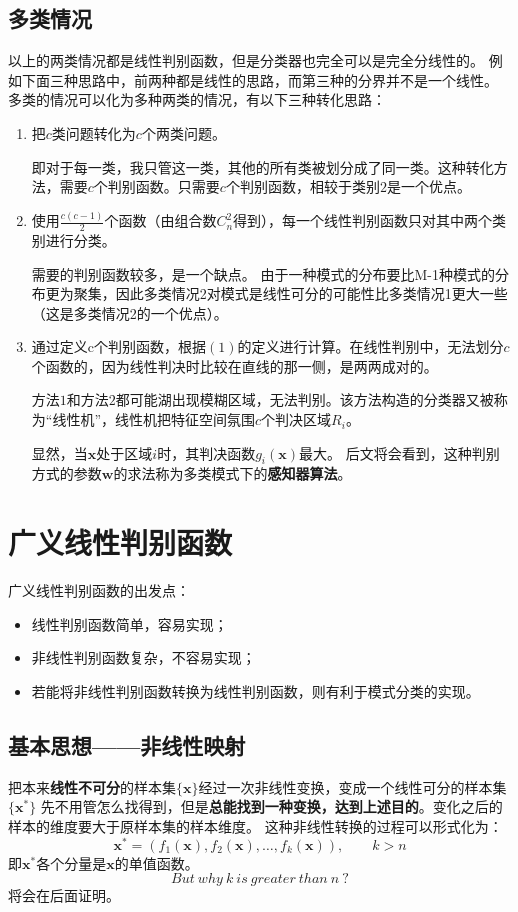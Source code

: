 \documentclass[12pt, letterpaper]{article}
\begin{document}
\subsection{多类情况}
以上的两类情况都是线性判别函数，但是分类器也完全可以是完全分线性的。
例如下面三种思路中，前两种都是线性的思路，而第三种的分界并不是一个线性。
多类的情况可以化为多种两类的情况，有以下三种转化思路：
\begin{enumerate}
\item 把$c$类问题转化为$c$个两类问题。

\qquad 即对于每一类，我只管这一类，其他的所有类被划分成了同一类。这种转化方法，需要$c$个判别函数。只需要$c$个判别函数，相较于类别$2$是一个优点。
\item 使用$\frac{c(c-1)}{2}$个函数（由组合数$C_n^2$得到），每一个线性判别函数只对其中两个类别进行分类。

\qquad 需要的判别函数较多，是一个缺点。
由于一种模式的分布要比M-1种模式的分布更为聚集，因此多类情况2对模式是线性可分的可能性比多类情况1更大一些（这是多类情况2的一个优点）。


\item 通过定义c个判别函数，根据$(1)$的定义进行计算。在线性判别中，无法划分$c$个函数的，因为线性判决时比较在直线的那一侧，是两两成对的。

\qquad 方法$1$和方法$2$都可能湖出现模糊区域，无法判别。该方法构造的分类器又被称为“线性机”，线性机把特征空间氛围$c$个判决区域$R_i$。

\qquad 显然，当$\mathbf{x}$处于区域$i$时，其判决函数$g_i(\mathbf{x})$最大。
后文将会看到，这种判别方式的参数$\mathbf{w}$的求法称为多类模式下的\textbf{感知器算法}。

\end{enumerate}
\section{广义线性判别函数}
广义线性判别函数的出发点：
\begin{itemize}
\item 线性判别函数简单，容易实现；
\item 非线性判别函数复杂，不容易实现；
\item 若能将非线性判别函数转换为线性判别函数，则有利于模式分类的实现。
\end{itemize}
\subsection{基本思想——非线性映射}
把本来\textbf{线性不可分}的样本集$\{\mathbf{x}\}$经过一次非线性变换，变成一个线性可分的样本集$\{\mathbf{x}^*\}$
先不用管怎么找得到，但是\textbf{总能找到一种变换，达到上述目的}。变化之后的样本的维度要大于原样本集的样本维度。
这种非线性转换的过程可以形式化为：
\begin{equation}
\mathbf{x^*}=(f_1(\mathbf{x}),f_2(\mathbf{x}),\ldots,f_k(\mathbf{x})),\qquad k>n
\end{equation}
即$\mathbf{x^*}$各个分量是$\mathbf{x}$的单值函数。
\begin{equation}
But\ why\ k\ is\ greater\ than\ n\ ?
\end{equation}
将会在后面证明。
\end{document}
